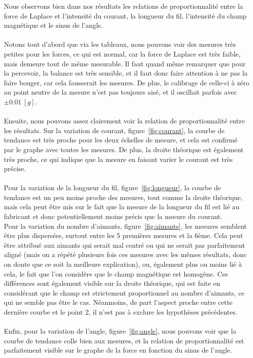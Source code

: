 \documentclass[11pt]{article}
\begin{document}
    Nous observons bien dans nos résultats les relations de proportionnalité entre la force de Laplace
    et l'intensité du courant, la longueur du fil, l'intensité du champ magnétique et le sinus de l'angle. \\ \\
    Notons tout d'abord que via les tableaux, nous pouvons voir des mesures très petites pour les forces,
    ce qui est normal, car la force de Laplace est très faible, mais demeure tout de même mesurable.
    Il faut quand même remarquer que pour la percevoir, la balance est très sensible, et il faut donc
    faire attention à ne pas la faire bouger, car cela fausserait les mesures.
    De plus, le calibrage de celle-ci à zéro au point neutre de la mesure n'est pas toujours aisé,
    et il oscillait parfois avec $\pm 0.01 \ [g]$. \\ \\
    Ensuite, nous pouvons assez clairement voir la relation de proportionnalité entre les résultats.
    Sur la variation de courant, figure~\ref{fig:courant}, la courbe de tendance est très proche pour les
    deux échelles de mesure, et cela est confirmé par le graphe avec toutes les mesures.
    De plus, la droite théorique est également très proche, ce qui indique que la mesure en faisant varier
    le courant est très précise. \\ \\
    Pour la variation de la longueur du fil, figure~\ref{fig:longueur}, la courbe de tendance est un peu
    moins proche des mesures, tout comme la droite théorique, mais cela peut être mis sur le fait que la mesure
    de la longueur du fil est lié au fabricant et donc potentiellement moins précis que la mesure du courant.\\
    Pour la variation du nombre d'aimants, figure~\ref{fig:aimants}, les mesures semblent être plus dispersées,
    surtout entre les 5 premières mesures et la 6ème.
    Cela peut être attribué aux aimants qui serait mal centré ou qui ne serait pas parfaitement aligné
    (mais on a répété plusieurs fois ces mesures avec les mêmes résultats, donc on doute que ce soit
    la meilleure explication), ou, également plus ou moins lié à cela, le fait que l'on considère que
    le champ magnétique est homogène.
    Ces différences sont également visible sur la droite théorique, qui est faite en considérant que le champ
    est strictement proportionnel au nombre d'aimants, ce qui ne semble pas être le cas.
    Néanmoins, de part l'aspect proche entre cette dernière courbe et le point 2, il n'est pas à exclure les
    hypothèses précédentes.\\ \\
    Enfin, pour la variation de l'angle, figure~\ref{fig:angle}, nous pouvons voir que la courbe de tendance
    colle bien aux mesures, et la relation de proportionnalité est parfaitement visible sur le graphe de la
    force en fonction du sinus de l'angle.
\end{document}
